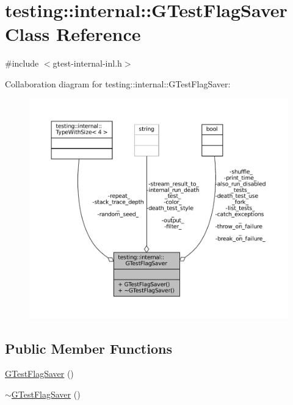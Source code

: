 \hypertarget{classtesting_1_1internal_1_1GTestFlagSaver}{}\section{testing\+:\+:internal\+:\+:G\+Test\+Flag\+Saver Class Reference}
\label{classtesting_1_1internal_1_1GTestFlagSaver}


{\ttfamily \#include $<$gtest-\/internal-\/inl.\+h$>$}



Collaboration diagram for testing\+:\+:internal\+:\+:G\+Test\+Flag\+Saver\+:
\nopagebreak
\begin{figure}[H]
\begin{center}
\leavevmode
\includegraphics[width=350pt]{classtesting_1_1internal_1_1GTestFlagSaver__coll__graph}
\end{center}
\end{figure}
\subsection*{Public Member Functions}
\begin{DoxyCompactItemize}
\item 
\hyperlink{classtesting_1_1internal_1_1GTestFlagSaver_ad94262f7765927bbe9a08e25f9c67530}{G\+Test\+Flag\+Saver} ()
\item 
\hyperlink{classtesting_1_1internal_1_1GTestFlagSaver_a5f00786b5c9045fd5dd7c42fd7dd1476}{$\sim$\+G\+Test\+Flag\+Saver} ()
\end{DoxyCompactItemize}
